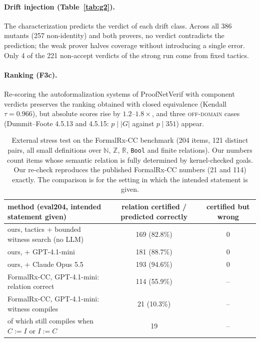 \documentclass[10pt]{article}
\theoremstyle{definition}
\newcommand{\V}[1]{\textsc{#1}}
\begin{document}
\paragraph{Drift injection (Table~\ref{tab:g2}).} The characterization predicts the verdict
of each drift class. Across all 386 mutants (257 non-identity) and both provers, no verdict
contradicts the prediction; the weak prover halves coverage without introducing a single
error. Only 4 of the 221 non-accept verdicts of the strong run come from fixed tactics.

\paragraph{Ranking (F3c).} Re-scoring the autoformalization systems of
ProofNetVerif with component verdicts preserves the ranking obtained with closed
equivalence (Kendall $\tau=0.966$), but absolute scores rise by $1.2$--$1.8\times$, and three
\V{off-domain} cases (Dummit--Foote 4.5.13 and 4.5.15: $p\mid|G|$ against $p\mid 351$) appear.

\begin{table}[t]
\centering\small
\begin{tabular}{lcc}
\toprule
method (eval204, intended statement given) & relation certified / predicted correctly & certified but wrong\\
\midrule
ours, tactics + bounded witness search (no LLM) & 169 (82.8\%) & 0\\
ours, + GPT-4.1-mini & 181 (88.7\%) & 0\\
ours, + Claude Opus 5.5 & 193 (94.6\%) & 0\\
\midrule
FormalRx-CC, GPT-4.1-mini: relation correct & 114 (55.9\%) & --\\
FormalRx-CC, GPT-4.1-mini: witness compiles & 21 (10.3\%) & --\\
\quad of which still compiles when $C:=I$ or $I:=C$ & 19 & --\\
\bottomrule
\end{tabular}
\caption{External stress test on the FormalRx-CC benchmark (204 items, 121 distinct pairs,
all small definitions over $\mathbb N$, $\mathbb Z$, $\mathbb R$, \texttt{Bool} and finite
relations). Our numbers count items whose semantic relation is fully determined by
kernel-checked goals. Our re-check reproduces the published FormalRx-CC numbers (21 and 114)
exactly. The comparison is for the setting in which the intended statement is given.}
\label{tab:cc}
\end{table}
\end{document}
